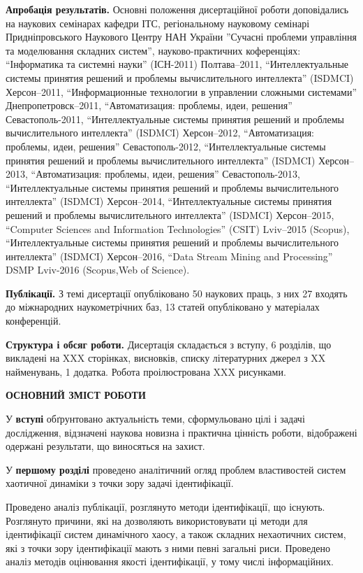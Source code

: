 \documentclass[a4paper,13pt]{atuaref}
\newcommand{\xsect}[1]{\medskip\begin{center}\textbf{#1}\end{center}\medskip\penalty10000}
\begin{document}
\smallskip
\textbf{Апробація результатів.}
Основні положення дисертаційної роботи доповідались на наукових
семінарах кафедри ІТС,
регіональному науковому семінарі Придніпровського Наукового Центру НАН України
''Сучасні проблеми управління та моделювання складних систем'',
науково-практичних коференціях:
``Інформатика та системні науки'' (ІСН-2011) Полтава--2011,
``Интеллектуальные системы принятия решений и проблемы вычислительного интеллекта'' (ISDMCI) Херсон--2011,
``Информационные технологии в управлении сложными системами'' Днепропетровск--2011,
``Автоматизация: проблемы, идеи, решения'' Севастополь-2011,
``Интеллектуальные системы принятия решений и проблемы вычислительного интеллекта'' (ISDMCI) Херсон--2012,
``Автоматизация: проблемы, идеи, решения'' Севастополь-2012,
``Интеллектуальные системы принятия решений и проблемы вычислительного интеллекта'' (ISDMCI) Херсон--2013,
``Автоматизация: проблемы, идеи, решения'' Севастополь-2013,
``Интеллектуальные системы принятия решений и проблемы вычислительного интеллекта'' (ISDMCI) Херсон--2014,
``Интеллектуальные системы принятия решений и проблемы вычислительного интеллекта'' (ISDMCI) Херсон--2015,
``Computer Sciences and Information Technologies'' (CSIT) Lviv--2015 (Scopus),
``Интеллектуальные системы принятия решений и проблемы вычислительного интеллекта'' (ISDMCI) Херсон--2016,
``Data Stream Mining and Processing'' DSMP Lviv-2016 (Scopus,Web of Science).

\smallskip
\textbf{Публікації.}
З темі дисертації опубліковано
50 наукових праць,
з них
27 входять до міжнародних наукометрічних баз,
13 статей опубліковано у матеріалах конференцій.

\smallskip
\textbf{Структура і обсяг роботи.}
Дисертація складається з вступу, 6 розділів, що викладені на
XXX сторінках, висновків, списку літературних джерел з
XX найменувань,
1 додатка.
Робота проілюстрована XXX рисунками.


\xsect{ОСНОВНИЙ ЗМІСТ РОБОТИ}

У \textbf{вступі} обґрунтовано актуальність теми,
сформульовано цілі і задачі дослідження,
відзначені наукова новизна і практична цінність роботи, відображені
одержані результати, що виносяться на захист.

У \textbf{першому розділі}
проведено аналітичний огляд проблем
властивостей систем хаотичної динаміки
з точки зору задачі ідентифікації.

Проведено аналіз публікації, розглянуто методи ідентифікації, що існують.
Розглянуто причини, які на дозволяють використовувати ці методи для
ідентифікації систем динамічного хаосу, а також складних нехаотичних систем, які
з точки зору ідентифікації мають з ними певні загальні риси.  Проведено аналіз
методів оцінювання якості ідентифікації, у тому числі інформаційних.
\end{document}
